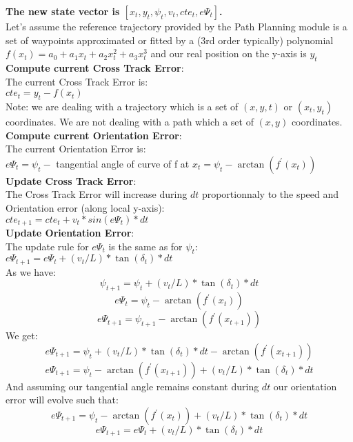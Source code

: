 \documentclass[11pt]{article}
\begin{document}
\textbf{The new state vector is $[x_t, y_t, \psi_t, v_t, cte_t, e\Psi_t]$.
} \\


Let's assume the reference trajectory provided by the Path Planning module is a set of waypoints approximated or fitted by a (3rd order typically) polynomial $f(x_t)= a_0 + a_1 x_t + a_2 x_t^2 + a_3 x_t^3$ and our real position on the y-axis is $y_t$ \\


\textbf{Compute current Cross Track Error}: \\
The current Cross Track Error is: \\
$ cte_t = y_t - f(x_t) $ \\
Note: we are dealing with a trajectory which is a set of $(x, y, t)$ or $(x_t, y_t)$ coordinates. We are not dealing with a path which a set of $(x, y)$ coordinates. \\

\textbf{Compute current Orientation Error}: \\
The current Orientation Error is: \\
$ e\Psi_t = \psi_t - $ tangential angle of curve of f at $x_t = \psi_t - \arctan(f^{'}(x_t)) $ \\

\textbf{Update Cross Track Error}: \\
The Cross Track Error will increase during $dt$ proportionnaly to the speed and Orientation error (along local y-axis): \\
$ cte_{t+1} = cte_t + v_t * sin(e\Psi_t) * dt $ \\

\textbf{Update Orientation Error}: \\
The update rule for $e\Psi_t$ is the same as for $\psi_t$: \\ 
$ e\Psi_{t+1} = e\Psi_t + (v_t / L) * \tan(\delta_t) * dt $ \\

As we have:
$$ \psi_{t+1} = \psi_t + (v_t / L) * \tan(\delta_t) * dt $$
$$ e\Psi_t = \psi_t - \arctan(f^{'}(x_t)) $$
$$ e\Psi_{t+1} = \psi_{t+1} - \arctan(f^{'}(x_{t+1})) $$
We get:
$$ e\Psi_{t+1} = \psi_t + (v_t / L) * \tan(\delta_t) * dt - \arctan(f^{'}(x_{t+1})) $$
$$ e\Psi_{t+1} = \psi_t - \arctan(f^{'}(x_{t+1})) + (v_t / L) * \tan(\delta_t) * dt  $$
And assuming our tangential angle remains constant during $dt$ our orientation error will evolve such that:
$$ e\Psi_{t+1} = \psi_t - \arctan(f^{'}(x_t)) + (v_t / L) * \tan(\delta_t) * dt  $$
$$ e\Psi_{t+1} = e\Psi_t + (v_t / L) * \tan(\delta_t) * dt  $$
\end{document}
